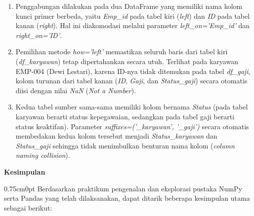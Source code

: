 \documentclass[12pt,a4paper]{article}
\begin{document}
\begin{enumerate}[label=\arabic*), leftmargin=3.00cm, labelwidth=0.75cm, labelsep=0cm, align=left]
    \item Penggabungan dilakukan pada dua DataFrame yang memiliki nama kolom kunci primer berbeda, yaitu \textit{Emp\_id} pada tabel kiri (\textit{left}) dan \textit{ID} pada tabel kanan (\textit{right}). Hal ini diakomodasi melalui parameter \textit{left\_on='Emp\_id'} dan \textit{right\_on='ID'}.
    \item Pemilihan metode \textit{how='left'} memastikan seluruh baris dari tabel kiri (\textit{df\_karyawan}) tetap dipertahankan secara utuh. Terlihat pada karyawan EMP-004 (Dewi Lestari), karena ID-nya tidak ditemukan pada tabel \textit{df\_gaji}, kolom turunan dari tabel kanan (\textit{ID}, \textit{Gaji}, dan \textit{Status\_gaji}) secara otomatis diisi dengan nilai \textit{NaN} (\textit{Not a Number}).
    \item Kedua tabel sumber sama-sama memiliki kolom bernama \textit{Status} (pada tabel karyawan berarti status kepegawaian, sedangkan pada tabel gaji berarti status keaktifan). Parameter \textit{suffixes=('\_karyawan', '\_gaji')} secara otomatis membedakan kedua kolom tersebut menjadi \textit{Status\_karyawan} dan \textit{Status\_gaji} sehingga tidak menimbulkan benturan nama kolom (\textit{column naming collision}).
\end{enumerate}

\newpage
{}
\noindent{}\textbf{\normalsize Kesimpulan}\par
\vspace{0.15cm}
\begin{adjustwidth}{0.75cm}{0pt}
\hspace*{0.85cm}Berdasarkan praktikum pengenalan dan eksplorasi pustaka NumPy serta Pandas yang telah dilaksanakan, dapat ditarik beberapa kesimpulan utama sebagai berikut:
\end{adjustwidth}
\end{document}
